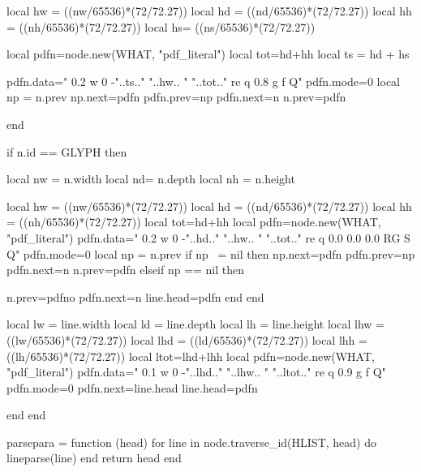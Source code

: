 {         	local hw = ((nw/65536)*(72/72.27))
          	local hd = ((nd/65536)*(72/72.27))
          	local hh = ((nh/65536)*(72/72.27))
            local hs=  ((ns/65536)*(72/72.27))
        
 	        local pdfn=node.new(WHAT, "pdf_literal")
            local tot=hd+hh %
            local ts = hd + hs %

            pdfn.data=" 0.2 w 0 -"..ts.." "..hw.. " "..tot.." re q 0.8 g f  Q"
       		pdfn.mode=0
 			local np = n.prev
             np.next=pdfn
             pdfn.prev=np
             pdfn.next=n
             n.prev=pdfn
                
         end %
         
         if n.id == GLYPH then
         
            local nw = n.width
            local nd=  n.depth
            local nh = n.height
            
         	local hw = ((nw/65536)*(72/72.27))
          	local hd = ((nd/65536)*(72/72.27))
          	local hh = ((nh/65536)*(72/72.27))
            local tot=hd+hh %
            local pdfn=node.new(WHAT, "pdf_literal")
            pdfn.data=" 0.2 w 0 -"..hd.." "..hw.. " "..tot.." re q 0.0 0.0 0.0 RG S  Q"
            pdfn.mode=0
  			local np = n.prev
            if np ~= nil then
            	np.next=pdfn
            	pdfn.prev=np
           		pdfn.next=n
            	n.prev=pdfn
            elseif np == nil then
                
                n.prev=pdfno
                pdfn.next=n 					
                line.head=pdfn  
                end
         end %
         
    	 local lw = line.width
            local ld = line.depth
            local lh = line.height
            local lhw = ((lw/65536)*(72/72.27))
          	local lhd = ((ld/65536)*(72/72.27))
          	local lhh = ((lh/65536)*(72/72.27))
            local ltot=lhd+lhh
            local pdfn=node.new(WHAT, "pdf_literal")
            pdfn.data=" 0.1 w 0 -"..lhd.." "..lhw.. " "..ltot.." re q 0.9 g f  Q"
      		pdfn.mode=0
            pdfn.next=line.head
            line.head=pdfn
         
	end %
end %

parsepara = function (head)
for line in node.traverse_id(HLIST, head) do
    lineparse(line)
end
return head
end
}

